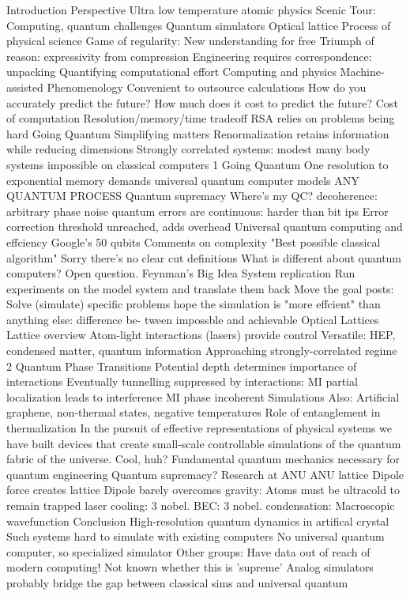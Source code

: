 {{{{{{ Introduction
Perspective
 Ultra low temperature atomic physics
 Scenic Tour: Computing, quantum challenges
 Quantum simulators
 Optical lattice
Process of physical science
 Game of regularity: New understanding for free
 Triumph of reason: expressivity from compression
 Engineering requires correspondence: unpacking
 Quantifying computational effort
Computing and physics
Machine-assisted Phenomenology
 Convenient to outsource calculations
 How do you accurately predict the future?
 How much does it cost to predict the future?
Cost of computation
 Resolution/memory/time tradeoff
 RSA relies on problems being hard
Going Quantum
Simplifying matters
 Renormalization retains information while reducing dimensions
 Strongly correlated systems: modest many body systems impossible on
classical computers
1
Going Quantum
 One resolution to exponential memory demands
 universal quantum computer models ANY QUANTUM PROCESS
Quantum supremacy
Where's my QC?
 decoherence: arbitrary phase noise
 quantum errors are continuous: harder than bit 
ips
 Error correction threshold unreached, adds overhead
 Universal quantum computing and effciency
 Google's 50 qubits
Comments on complexity
 "Best possible classical algorithm"
 Sorry there's no clear cut definitions
 What is different about quantum computers? Open question.
Feynman's Big Idea
 System replication
 Run experiments on the model system and translate them back
 Move the goal posts: Solve (simulate) specific problems
 hope the simulation is "more effcient" than anything else: difference be-
tween impossble and achievable
Optical Lattices
Lattice overview
 Atom-light interactions (lasers) provide control
 Versatile: HEP, condensed matter, quantum information
 Approaching strongly-correlated regime
2
Quantum Phase Transitions
 Potential depth determines importance of interactions
 Eventually tunnelling suppressed by interactions: MI
 partial localization leads to interference
 MI phase incoherent
Simulations
 Also: Artificial graphene, non-thermal states, negative temperatures
 Role of entanglement in thermalization
 In the pursuit of effective representations of physical systems we have built
devices that create small-scale controllable simulations of the quantum
fabric of the universe. Cool, huh?
 Fundamental quantum mechanics necessary for quantum engineering
Quantum supremacy?
Research at ANU
ANU lattice
 Dipole force creates lattice
 Dipole barely overcomes gravity: Atoms must be ultracold to remain
trapped
 laser cooling: 3 nobel. BEC: 3 nobel.
 condensation: Macroscopic wavefunction
Conclusion
 High-resolution quantum dynamics in artifical crystal
 Such systems hard to simulate with existing computers
 No universal quantum computer, so specialized simulator
 Other groups: Have data out of reach of modern computing!
 Not known whether this is 'supreme'
 Analog simulators probably bridge the gap between classical sims and
universal quantum



}}}}}}
